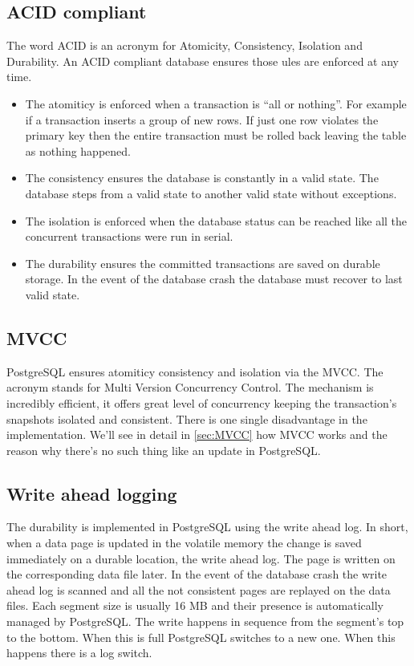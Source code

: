 \subsection{ACID compliant}
The word ACID is an acronym for Atomicity, Consistency, Isolation and Durability. An 
ACID compliant database ensures those ules are enforced at any time. \newline
\begin{itemize}

\item The atomiticy is enforced when a transaction is ``all or nothing''. For example if a 
transaction inserts a group of new rows. If just one row violates the primary key then the entire 
transaction must be rolled back leaving the table as nothing happened.

\item The consistency ensures the database is constantly in a valid state. The database steps from 
a valid state to another valid state without exceptions.

 \item The isolation is enforced when the database status can be reached like all the concurrent 
transactions were run in serial. 

\item The durability ensures the committed transactions are saved on durable storage. In the event 
of the database crash the database must recover to last valid state.

\end{itemize}

\subsection{MVCC}
PostgreSQL ensures atomiticy consistency and isolation via the MVCC. The acronym stands 
for Multi Version Concurrency Control. The mechanism is incredibly efficient, it offers
great level of concurrency keeping the transaction's snapshots isolated and consistent. There is 
one single disadvantage in the implementation. We'll see in detail in \ref{sec:MVCC} how MVCC works 
and the reason why there's no such thing like an update in PostgreSQL.

\subsection{Write ahead logging}
The durability is implemented in PostgreSQL using the write ahead log.
In short, when a data page is updated in the volatile memory the change is saved immediately on 
a durable location, the write ahead log. The page is written 
on the corresponding data file later. In the event of the database crash the write ahead log is 
scanned and all the not consistent pages are replayed on the data files.
Each segment size is usually 16 MB and their presence is automatically managed by PostgreSQL. 
The write happens in sequence from the segment's top to the bottom. When this is full PostgreSQL 
switches to a new one. When this happens there is a log switch. 

